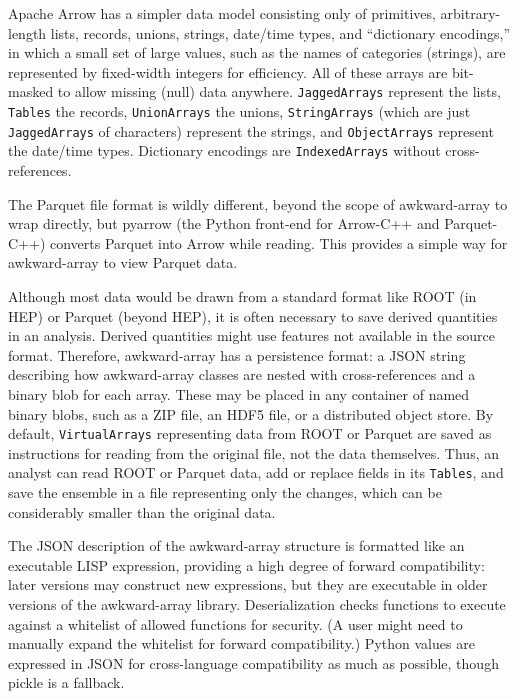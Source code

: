 \documentclass{webofc}
\begin{document}
Apache Arrow has a simpler data model consisting only of primitives, arbitrary-length lists, records, unions, strings, date/time types, and ``dictionary encodings,'' in which a small set of large values, such as the names of categories (strings), are represented by fixed-width integers for efficiency. All of these arrays are bit-masked to allow missing (null) data anywhere. {\tt\small JaggedArrays} represent the lists, {\tt\small Tables} the records, {\tt\small UnionArrays} the unions, {\tt\small StringArrays} (which are just {\tt\small JaggedArrays} of characters) represent the strings, and {\tt\small ObjectArrays} represent the date/time types. Dictionary encodings are {\tt\small IndexedArrays} without cross-references.

The Parquet file format is wildly different, beyond the scope of awkward-array to wrap directly, but pyarrow (the Python front-end for Arrow-C++ and Parquet-C++) converts Parquet into Arrow while reading. This provides a simple way for awkward-array to view Parquet data.

Although most data would be drawn from a standard format like ROOT (in HEP) or Parquet (beyond HEP), it is often necessary to save derived quantities in an analysis. Derived quantities might use features not available in the source format. Therefore, awkward-array has a persistence format: a JSON string describing how awkward-array classes are nested with cross-references and a binary blob for each array. These may be placed in any container of named binary blobs, such as a ZIP file, an HDF5 file, or a distributed object store. By default, {\tt\small VirtualArrays} representing data from ROOT or Parquet are saved as instructions for reading from the original file, not the data themselves. Thus, an analyst can read ROOT or Parquet data, add or replace fields in its {\tt\small Tables}, and save the ensemble in a file representing only the changes, which can be considerably smaller than the original data.

The JSON description of the awkward-array structure is formatted like an executable LISP expression, providing a high degree of forward compatibility: later versions may construct new expressions, but they are executable in older versions of the awkward-array library. Deserialization checks functions to execute against a whitelist of allowed functions for security. (A user might need to manually expand the whitelist for forward compatibility.) Python values are expressed in JSON for cross-language compatibility as much as possible, though pickle is a fallback.
\end{document}
